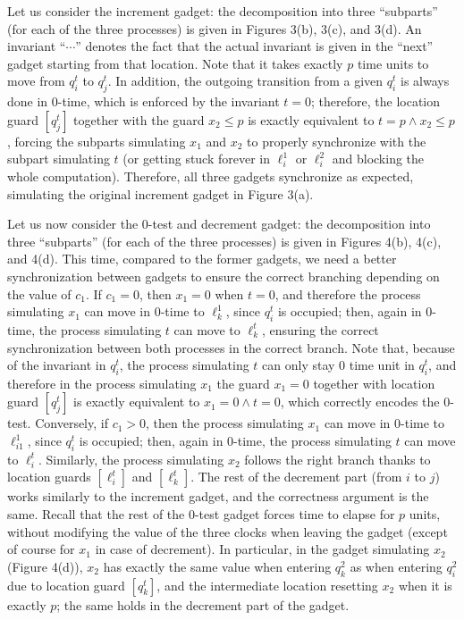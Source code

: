 \documentclass[10pt,a4paper]{article}
\begin{document}
Let us consider the increment gadget: the decomposition into three “subparts” (for each of the three processes) is given in Figures 3(b), 3(c), and 3(d). An invariant “$\cdots$” denotes the fact that the actual invariant is given in the “next” gadget starting from that location. Note that it takes exactly $p$ time units to move from $q_{i}^{t}$ to $q_{j}^{t}$. In addition, the outgoing transition from a given $q_{i}^{t}$ is always done in 0-time, which is enforced by the invariant $t=0$; therefore, the location guard $[q_{j}^{t}]$ together with the guard $x_{2}\leq p$ is exactly equivalent to $t=p\land x_{2}\leq p$, forcing the subparts simulating $x_{1}$ and $x_{2}$ to properly synchronize with the subpart simulating $t$ (or getting stuck forever in $\mathrm{\mathrm{\ell}}_{i}^{1}$ or $\mathrm{\mathrm{\ell}}_{i}^{2}$ and blocking the whole computation). Therefore, all three gadgets synchronize as expected, simulating the original increment gadget in Figure 3(a).\par
 
 
 
Let us now consider the 0-test and decrement gadget: the decomposition into three “subparts” (for each of the three processes) is given in Figures 4(b), 4(c), and 4(d). This time, compared to the former gadgets, we need a better synchronization between gadgets to ensure the correct branching depending on the value of $c_{1}$. If $c_{1}=0$, then $x_{1}=0$ when $t=0$, and therefore the process simulating $x_{1}$ can move in 0-time to $\mathrm{\mathrm{\ell}}_{k}^{1}$, since $q_{i}^{t}$ is occupied; then, again in 0-time, the process simulating $t$ can move to $\mathrm{\mathrm{\ell}}_{k}^{t}$, ensuring the correct synchronization between both processes in the correct branch. Note that, because of the invariant in $q_{i}^{t}$, the process simulating $t$ can only stay 0 time unit in $q_{i}^{t}$, and therefore in the process simulating $x_{1}$ the guard $x_{1}=0$ together with location guard $[q_{j}^{t}]$ is exactly equivalent to $x_{1}=0\land t=0$, which correctly encodes the 0-test. Conversely, if $c_{1}>0$, then the process simulating $x_{1}$ can move in 0-time to $\mathrm{\mathrm{\ell}}_{i1}^{1}$, since $q_{i}^{t}$ is occupied; then, again in 0-time, the process simulating $t$ can move to $\mathrm{\mathrm{\ell}}_{i}^{t}$. Similarly, the process simulating $x_{2}$ follows the right branch thanks to location guards $[\mathrm{\mathrm{\ell}}_{i}^{t}]$ and $[\mathrm{\mathrm{\ell}}_{k}^{t}]$. The rest of the decrement part (from $i$ to $j$) works similarly to the increment gadget, and the correctness argument is the same. Recall that the rest of the 0-test gadget forces time to elapse for $p$ units, without modifying the value of the three clocks when leaving the gadget (except of course for $x_{1}$ in case of decrement). In particular, in the gadget simulating $x_{2}$ (Figure 4(d)), $x_{2}$ has exactly the same value when entering $q_{k}^{2}$ as when entering $q_{i}^{2}$ due to location guard $[q_{k}^{t}]$, and the intermediate location resetting $x_{2}$ when it is exactly $p$; the same holds in the decrement part of the gadget.\par
 
\end{document}
